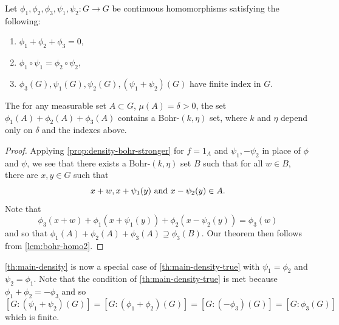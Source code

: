 \begin{theorem} \label{th:main-density-true}
Let $\phi_1, \phi_2, \phi_3, \psi_1, \psi_2: G \rightarrow G$ be continuous homomorphisms satisfying the following:
\begin{enumerate}
\item $\phi_1 + \phi_2 + \phi_3=0$,
\item $\phi_1 \circ \psi_1 = \phi_2 \circ \psi_2$,
\item $\phi_3(G), \psi_1(G), \psi_2(G), (\psi_1 + \psi_2)(G)$ have finite index in $G$.
\end{enumerate}
The for any measurable set $A \subset G$, $\mu(A) = \delta >0$, the set $\phi_1(A) + \phi_2(A) + \phi_3(A)$ contains a Bohr-$(k, \eta)$ set, where $k$ and $\eta$ depend only on $\delta$ and the indexes above. 
\end{theorem}
\begin{proof}
Applying \cref{prop:density-bohr-stronger} for $f=1_A$ and $\psi_1, -\psi_2$ in place of $\phi$ and $\psi$, we see that there exists a Bohr-$(k,\eta)$ set $B$ such that for all $w \in B$, there are $x, y \in G$ such that
\[
x+w , x+\psi_1(y) \textup{ and } x-\psi_{2}(y) \in A.
\]
Note that
\[
\phi_3(x + w) + \phi_1(x+\psi_1(y)) + \phi_2(x-\psi_2(y)) = \phi_3(w)
\]
and so that $\phi_1(A) + \phi_2(A) + \phi_3(A) \supseteq \phi_3(B)$.
Our theorem then follows from \cref{lem:bohr-homo2}.
\end{proof}

\cref{th:main-density} is now a special case of \cref{th:main-density-true} with $\psi_1 = \phi_2$ and $\psi_2 = \phi_1$. Note that the condition of \cref{th:main-density-true} is met because $\phi_1 + \phi_2 = - \phi_3$ and so
\[
    [G: (\psi_1 + \psi_2)(G)] = [G:(\phi_1 + \phi_2)(G)] = [G:(-\phi_3)(G)] = [G: \phi_3(G)]
\]
which is finite.

